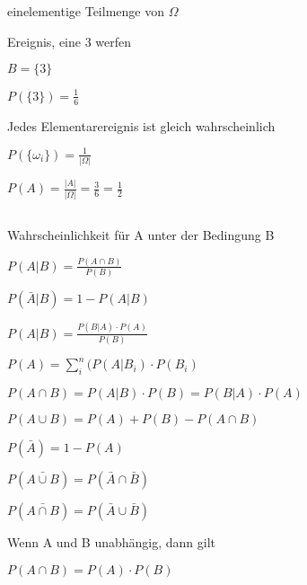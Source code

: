 \documentclass[10pt,a4paper,landscape]{article}
\begin{document}
\begin{multicols*}{4}
\noindent{}
\parbox{\columnwidth}{\centering einelementige Teilmenge von $\Omega$}
\parbox{\columnwidth}{\centering Ereignis, eine 3 werfen}
\parbox{\columnwidth}{\centering $B = \{ 3 \}$}
\parbox{\columnwidth}{\centering $P(\{3\}) = \frac{1}{6}$}

\noindent{}
\parbox{\columnwidth}{\centering Jedes Elementarereignis ist gleich wahrscheinlich}
\parbox{\columnwidth}{\centering $P(\{\omega_i\}) = \frac{1}{\vert \Omega \vert}$}
\parbox{\columnwidth}{\centering $P(A) = \frac{\vert A \vert}{\vert \Omega \vert} = \frac{3}{6} = \frac{1}{2}$}

\subsection{\noindent{}}

\noindent{}
\parbox{\columnwidth}{\centering Wahrscheinlichkeit für A unter der Bedingung B}
\parbox{\columnwidth}{\centering $P(A \vert B) = \frac{P(A \cap B)}{P(B)}$}
\parbox{\columnwidth}{\centering $P(\bar{A} \vert B) = 1 - P(A \vert B)$}

\noindent{}
\parbox{\columnwidth}{\centering $P(A \vert B) = \frac{P(B \vert A) \cdot P(A)}{P(B)}$}

\noindent{}
\parbox{\columnwidth}{\centering $P(A) = \sum \limits_{i}^n (P(A \vert B_i) \cdot P(B_i)$}

\noindent{}
\parbox{\columnwidth}{\centering $P(A \cap B) = P(A \vert B) \cdot P(B) = P(B \vert A) \cdot P(A)$}
\parbox{\columnwidth}{\centering $P(A \cup B) = P(A) + P(B) - P(A \cap B)$}
\parbox{\columnwidth}{\centering $P(\bar{A}) = 1 - P(A)$}
\parbox{\columnwidth}{\centering $P(\bar{A \cup B}) = P(\bar{A} \cap \bar{B})$}
\parbox{\columnwidth}{\centering $P(\bar{A \cap B}) = P(\bar{A} \cup \bar{B})$}
\parbox{\columnwidth}{\centering Wenn A und B unabhängig, dann gilt}
\parbox{\columnwidth}{\centering $P(A \cap B) = P(A) \cdot P(B)$}

\subsection{\noindent{}}


\end{multicols*}
\end{document}
